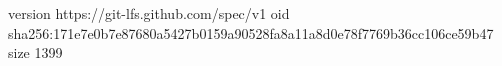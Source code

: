 version https://git-lfs.github.com/spec/v1
oid sha256:171e7e0b7e87680a5427b0159a90528fa8a11a8d0e78f7769b36cc106ce59b47
size 1399
